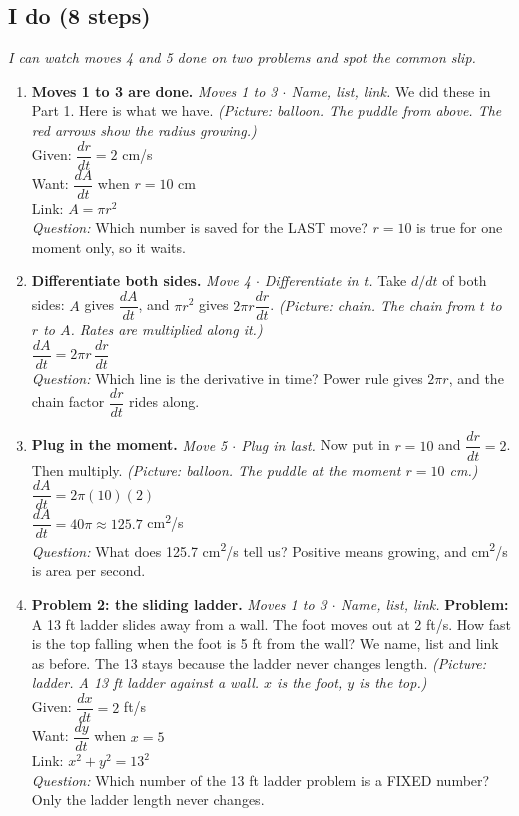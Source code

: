 \documentclass[11pt]{article}
\begin{document}
\subsection*{I do (8 steps)}
\textit{I can watch moves 4 and 5 done on two problems and spot the common slip.}\par
\begin{enumerate}
\item \textbf{Moves 1 to 3 are done.} \textit{Moves 1 to 3 $\cdot$ Name, list, link.} We did these in Part 1. Here is what we have. \textit{(Picture: balloon. The puddle from above. The red arrows show the radius growing.)}\\ Given: $\dfrac{dr}{dt}=2$ cm/s\\ Want: $\dfrac{dA}{dt}$ when $r=10$ cm\\ Link: $A=\pi r^2$\\ \textit{Question:} Which number is saved for the LAST move?  $r=10$ is true for one moment only, so it waits.
\item \textbf{Differentiate both sides.} \textit{Move 4 $\cdot$ Differentiate in t.} Take $d/dt$ of both sides: $A$ gives $\dfrac{dA}{dt}$, and $\pi r^2$ gives $2\pi r\dfrac{dr}{dt}$. \textit{(Picture: chain. The chain from $t$ to $r$ to $A$. Rates are multiplied along it.)}\\ $\dfrac{dA}{dt}=2\pi r\,\dfrac{dr}{dt}$\\ \textit{Question:} Which line is the derivative in time?  Power rule gives $2\pi r$, and the chain factor $\dfrac{dr}{dt}$ rides along.
\item \textbf{Plug in the moment.} \textit{Move 5 $\cdot$ Plug in last.} Now put in $r=10$ and $\dfrac{dr}{dt}=2$. Then multiply. \textit{(Picture: balloon. The puddle at the moment $r=10$ cm.)}\\ $\dfrac{dA}{dt}=2\pi(10)(2)$\\ $\dfrac{dA}{dt}=40\pi\approx125.7$ cm\textsuperscript{2}/s\\ \textit{Question:} What does 125.7 cm\textsuperscript{2}/s tell us?  Positive means growing, and cm\textsuperscript{2}/s is area per second.
\item \textbf{Problem 2: the sliding ladder.} \textit{Moves 1 to 3 $\cdot$ Name, list, link.} \textbf{Problem:} A 13 ft ladder slides away from a wall. The foot moves out at 2 ft/s. How fast is the top falling when the foot is 5 ft from the wall? We name, list and link as before. The 13 stays because the ladder never changes length. \textit{(Picture: ladder. A 13 ft ladder against a wall. $x$ is the foot, $y$ is the top.)}\\ Given: $\dfrac{dx}{dt}=2$ ft/s\\ Want: $\dfrac{dy}{dt}$ when $x=5$\\ Link: $x^2+y^2=13^2$\\ \textit{Question:} Which number of the 13 ft ladder problem is a FIXED number?  Only the ladder length never changes.

\end{enumerate}
\end{document}
